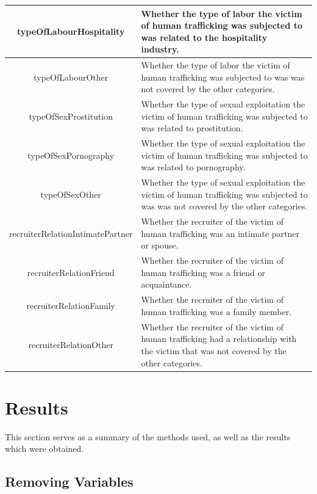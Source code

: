 \documentclass{article} %
\begin{document}
\begin{longtable}{|c|p{8cm}|}
		\hline
		typeOfLabourHospitality & Whether the type of labor the victim of human trafficking was subjected to was related to the hospitality industry.\\
		\hline
		typeOfLabourOther & Whether the type of labor the victim of human trafficking was subjected to was was not covered by the other categories.\\
		\hline
		typeOfSexProstitution & Whether the type of sexual exploitation the victim of human trafficking was subjected to was related to prostitution.\\
		\hline
		typeOfSexPornography & Whether the type of sexual exploitation the victim of human trafficking was subjected to was related to pornography.\\
		typeOfSexOther & Whether the type of sexual exploitation the victim of human trafficking was subjected to was was not covered by the other categories.\\
		\hline
		recruiterRelationIntimatePartner & Whether the recruiter of the victim of human trafficking was an intimate partner or spouse.\\
		\hline
		recruiterRelationFriend & Whether the recruiter of the victim of human trafficking was a friend or acquaintance.\\
		\hline
		recruiterRelationFamily & Whether the recruiter of the victim of human trafficking was a family member.\\
		\hline
		recruiterRelationOther & Whether the recruiter of the victim of human trafficking had a relationship with the victim that was not covered by the other categories.\\
		\hline
	\end{longtable}
	

\FloatBarrier



	\newpage
	\section{Results}
	
	This section serves as a summary of the methods used, as well as the results which were obtained.
	
	\subsection{Removing Variables}
	
\end{document}
